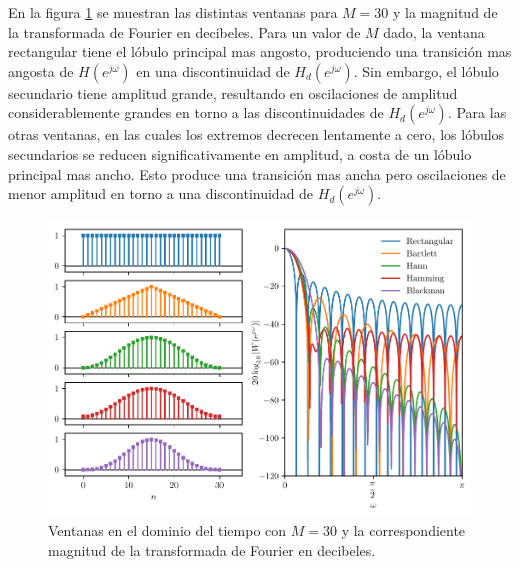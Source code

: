 \documentclass[a4paper]{report}
\begin{document}
En la figura \ref{fig:filter_design_windowing_windows_spectrum} se muestran las distintas ventanas para \(M=30\) y la magnitud de la transformada de Fourier en decibeles. Para un valor de \(M\) dado, la ventana rectangular tiene el lóbulo principal mas angosto, produciendo una transición mas angosta de \(H(e^{j\omega})\) en una discontinuidad de \(H_d(e^{j\omega})\). Sin embargo, el lóbulo secundario tiene amplitud grande, resultando en oscilaciones de amplitud considerablemente grandes en torno a las discontinuidades de \(H_d(e^{j\omega})\). Para las otras ventanas, en las cuales los extremos decrecen lentamente a cero, los lóbulos secundarios se reducen significativamente en amplitud, a costa de un lóbulo principal mas ancho. Esto produce una transición mas ancha pero oscilaciones de menor amplitud en torno a una discontinuidad de \(H_d(e^{j\omega})\).
\begin{figure}[!htb]
 \begin{center}
 \includegraphics[width=1\textwidth]{figuras/filter_design_windowing_windows_spectrum.pdf}
 \caption{\label{fig:filter_design_windowing_windows_spectrum} Ventanas en el dominio del tiempo con \(M=30\) y la correspondiente magnitud de la transformada de Fourier en decibeles.}
 \end{center}
\end{figure}
\end{document}
